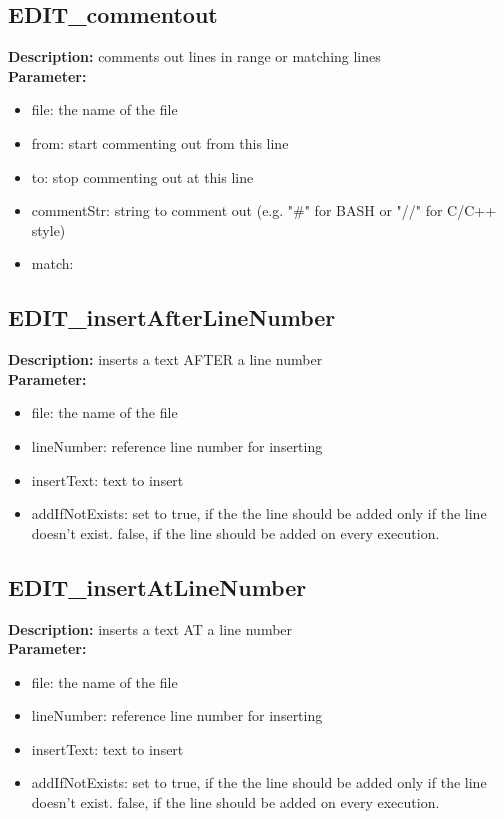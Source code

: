 \subsection{EDIT\_commentout}
\textbf{Description:} comments out lines in range or matching lines\\
\textbf{Parameter:}
\begin{itemize}
\item file: the name of the file
\item from: start commenting out from this line
\item to: stop commenting out at this line
\item commentStr: string to comment out (e.g. "\#" for BASH or "//" for C/C++ style)
\item match: 
\end{itemize}

\subsection{EDIT\_insertAfterLineNumber}
\textbf{Description:} inserts a text AFTER a line number\\
\textbf{Parameter:}
\begin{itemize}
\item file: the name of the file
\item lineNumber: reference line number for inserting
\item insertText: text to insert
\item addIfNotExists: set to true, if the the line should be added only if the line doesn't exist. false, if the line should be added on every execution.
\end{itemize}

\subsection{EDIT\_insertAtLineNumber}
\textbf{Description:} inserts a text AT a line number\\
\textbf{Parameter:}
\begin{itemize}
\item file: the name of the file
\item lineNumber: reference line number for inserting
\item insertText: text to insert
\item addIfNotExists: set to true, if the the line should be added only if the line doesn't exist. false, if the line should be added on every execution.
\end{itemize}

